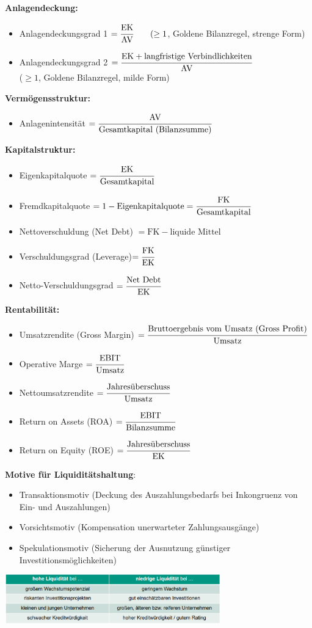 \textbf{Anlagendeckung:}
\begin{itemize}
	\item Anlagendeckungsgrad 1 $=\cfrac{\text{EK}}{\text{AV}}\qquad (\geq 1$, Goldene Bilanzregel, strenge Form)
	\item Anlagendeckungsgrad 2 $=\cfrac{\text{EK}+\text{langfristige Verbindlichkeiten}}{\text{AV}}$\\ ($\geq 1$, Goldene Bilanzregel, milde Form)
\end{itemize}

\textbf{Vermögensstruktur:}
\begin{itemize}
	\item Anlagenintensität $=\cfrac{\text{AV}}{\text{Gesamtkapital (Bilanzsumme)}}$
\end{itemize}
	
\textbf{Kapitalstruktur:}
\begin{itemize}
	\item Eigenkapitalquote $=\cfrac{\text{EK}}{\text{Gesamtkapital}}$
	\item Fremdkapitalquote $=1 - \text{Eigenkapitalquote} =\cfrac{\text{FK}}{\text{Gesamtkapital}}$
	\item Nettoverschuldung (Net Debt) $=\text{FK} - \text{liquide Mittel}$
	\item Verschuldungsgrad (Leverage)$=\cfrac{\text{FK}}{\text{EK}}$
	\item Netto-Verschuldungsgrad $=\cfrac{\text{Net Debt}}{\text{EK}}$
\end{itemize}

\textbf{Rentabilität:}
\begin{itemize}
	\item Umsatzrendite (Gross Margin) $=\cfrac{\text{Bruttoergebnis vom Umsatz (Gross Profit)}}{\text{Umsatz}}$
	\item Operative Marge $=\cfrac{\text{EBIT}}{\text{Umsatz}}$
	\item Nettoumsatzrendite $=\cfrac{\text {Jahresüberschuss}}{\text{Umsatz}}$
	\item Return on Assets (ROA) $=\cfrac{\text{EBIT}}{\text{Bilanzsumme}}$
	\item Return on Equity (ROE) $=\cfrac{\text{Jahresüberschuss}}{\text{EK}}$
\end{itemize}
\bigskip
\textbf{Motive für Liquiditätshaltung}:
\begin{itemize}
	\item Transaktionsmotiv (Deckung des Auszahlungsbedarfs bei Inkongruenz von Ein- und Auszahlungen)
	\item Vorsichtsmotiv (Kompensation unerwarteter Zahlungsausgänge)
	\item Spekulationsmotiv (Sicherung der Ausnutzung günstiger Investitionsmöglichkeiten)
\end{itemize}
\begin{center}
	\includegraphics[width=0.7\textwidth]{images/e3.png}
\end{center}
\pagebreak

